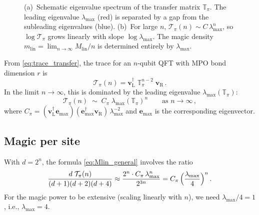 \documentclass[11pt,a4paper]{article}
\theoremstyle{definition}
\theoremstyle{remark}
\newcommand{\Mlin}{M_{\mathrm{lin}}}
\begin{document}
\begin{figure}[ht]
\caption{(a)~Schematic eigenvalue spectrum of the transfer matrix $\mathbb{T}_\pi$.
The leading eigenvalue $\lambda_{\max}$ (red) is separated by a gap from the subleading eigenvalues (blue).
(b)~For large $n$, $\mathcal{T}_\pi(n) \sim C\,\lambda_{\max}^n$, so $\log\mathcal{T}_\pi$ grows linearly with slope $\log\lambda_{\max}$.
The magic density $m_{\mathrm{lin}} = \lim_{n\to\infty}\Mlin/n$ is determined entirely by $\lambda_{\max}$.}
\label{fig:thermo_limit}
\end{figure}

From \eqref{eq:trace_transfer}, the trace for an $n$-qubit QFT with MPO bond dimension $r$ is
\begin{equation}
  \mathcal{T}_\pi(n) = \mathbf{v}_{\mathrm{L}}^\dagger\;\mathbb{T}_\pi^{n-2}\;\mathbf{v}_{\mathrm{R}}\,.
\end{equation}
In the limit $n\to\infty$, this is dominated by the leading eigenvalue $\lambda_{\max}(\mathbb{T}_\pi)$:
\begin{equation}\label{eq:asymptotic}
  \mathcal{T}_\pi(n) \;\sim\; C_\pi\;\lambda_{\max}(\mathbb{T}_\pi)^n\qquad\text{as }n\to\infty\,,
\end{equation}
where $C_\pi = (\mathbf{v}_{\mathrm{L}}^\dagger \mathbf{e}_{\max})(\mathbf{e}_{\max}^\dagger \mathbf{v}_{\mathrm{R}})\,\lambda_{\max}^{-2}$ and $\mathbf{e}_{\max}$ is the corresponding eigenvector.

\subsection{Magic per site}

With $d=2^n$, the formula \eqref{eq:Mlin_general} involves the ratio
\begin{equation}
  \frac{d\;\mathcal{T}_\pi(n)}{(d+1)(d+2)(d+4)} \approx \frac{2^n \cdot C_\pi\,\lambda_{\max}^n}{2^{3n}} = C_\pi\,\Bigl(\frac{\lambda_{\max}}{4}\Bigr)^n\,.
\end{equation}
For the magic power to be extensive (scaling linearly with $n$), we need $\lambda_{\max}/4 = 1$, i.e., $\lambda_{\max}=4$.
\end{document}
